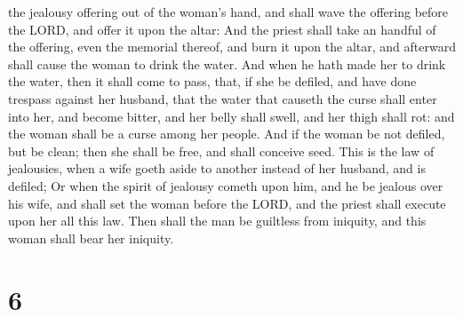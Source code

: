 the jealousy offering out of the woman's hand, and shall wave the
offering before the LORD, and offer it upon the altar:  And
the priest shall take an handful of the offering, even the memorial
thereof, and burn it upon the altar, and afterward shall cause the woman
to drink the water.  And when he hath made her to drink the
water, then it shall come to pass, that, if she be defiled, and have
done trespass against her husband, that the water that causeth the curse
shall enter into her, and become bitter, and her belly shall swell, and
her thigh shall rot: and the woman shall be a curse among her people.
 And if the woman be not defiled, but be clean; then she
shall be free, and shall conceive seed.  This is the law of
jealousies, when a wife goeth aside to another instead of her husband,
and is defiled;  Or when the spirit of jealousy cometh upon
him, and he be jealous over his wife, and shall set the woman before the
LORD, and the priest shall execute upon her all this law. 
Then shall the man be guiltless from iniquity, and this woman shall bear
her iniquity.

\hypertarget{section-5}{%
\section{6}\label{section-5}}

